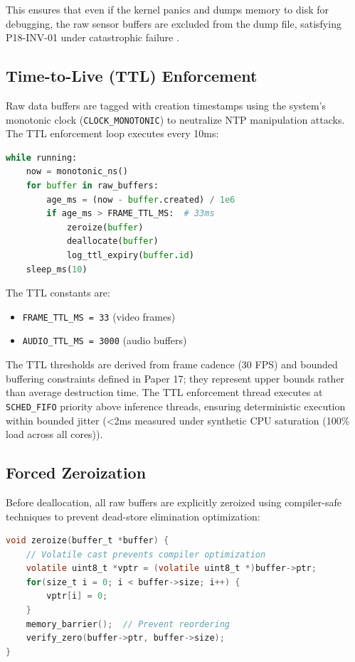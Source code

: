 \documentclass[conference]{IEEEtran}
\begin{document}
This ensures that even if the kernel panics and dumps memory to disk for debugging, the raw sensor buffers are excluded from the dump file, satisfying P18-INV-01 under catastrophic failure \cite{b21}.

\subsection{Time-to-Live (TTL) Enforcement}
Raw data buffers are tagged with creation timestamps using the system's monotonic clock (\texttt{CLOCK\_MONOTONIC}) to neutralize NTP manipulation attacks. The TTL enforcement loop executes every 10ms:

\begin{lstlisting}[language=Python, caption={TTL Enforcement Loop}]
while running:
    now = monotonic_ns()
    for buffer in raw_buffers:
        age_ms = (now - buffer.created) / 1e6
        if age_ms > FRAME_TTL_MS:  # 33ms
            zeroize(buffer)
            deallocate(buffer)
            log_ttl_expiry(buffer.id)
    sleep_ms(10)
\end{lstlisting}

The TTL constants are:
\begin{itemize}
    \item \texttt{FRAME\_TTL\_MS = 33} (video frames)
    \item \texttt{AUDIO\_TTL\_MS = 3000} (audio buffers)
\end{itemize}

The TTL thresholds are derived from frame cadence (30 FPS) and bounded buffering constraints defined in Paper 17; they represent upper bounds rather than average destruction time. The TTL enforcement thread executes at \texttt{SCHED\_FIFO} priority above inference threads, ensuring deterministic execution within bounded jitter (<2ms measured under synthetic CPU saturation (100\% load across all cores)).

\subsection{Forced Zeroization}
Before deallocation, all raw buffers are explicitly zeroized using compiler-safe techniques to prevent dead-store elimination optimization:

\begin{lstlisting}[language=C, caption={Zeroization Procedure}]
void zeroize(buffer_t *buffer) {
    // Volatile cast prevents compiler optimization
    volatile uint8_t *vptr = (volatile uint8_t *)buffer->ptr;
    for(size_t i = 0; i < buffer->size; i++) {
        vptr[i] = 0;
    }
    memory_barrier();  // Prevent reordering
    verify_zero(buffer->ptr, buffer->size);
}
\end{lstlisting}
\end{document}

